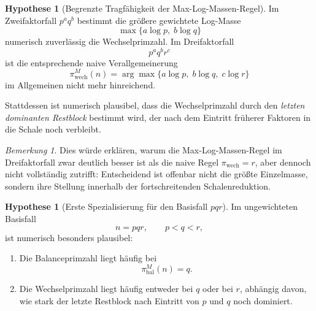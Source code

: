 \documentclass[11pt,a4paper]{article}
\theoremstyle{definition}
\newtheorem{hypothese}[satz]{Hypothese}
\theoremstyle{remark}
\newtheorem{bemerkung}[satz]{Bemerkung}
\begin{document}
	\begin{hypothese}[Begrenzte Tragfähigkeit der Max-Log-Massen-Regel]
		\label{hyp:dreifaktor_maxlog_begrenzt}
		Im Zweifaktorfall \(p^a q^b\) bestimmt die größere gewichtete Log-Masse
		\[
		\max\{a\log p,\; b\log q\}
		\]
		numerisch zuverlässig die Wechselprimzahl. Im Dreifaktorfall
		\[
		p^a q^b r^c
		\]
		ist die entsprechende naive Verallgemeinerung
		\[
		\pi_{\mathrm{wech}}^{M}(n)=\arg\max\{a\log p,\; b\log q,\; c\log r\}
		\]
		im Allgemeinen nicht mehr hinreichend.
		
		Stattdessen ist numerisch plausibel, dass die Wechselprimzahl durch den \emph{letzten
			dominanten Restblock} bestimmt wird, der nach dem Eintritt früherer Faktoren in die
		Schale noch verbleibt.
	\end{hypothese}
	
	\begin{bemerkung}
		Dies würde erklären, warum die Max-Log-Massen-Regel im Dreifaktorfall zwar deutlich besser
		ist als die naive Regel \(\pi_{\mathrm{wech}}=r\), aber dennoch nicht vollständig
		zutrifft: Entscheidend ist offenbar nicht die größte Einzelmasse, sondern ihre Stellung
		innerhalb der fortschreitenden Schalenreduktion.
	\end{bemerkung}
	
	\begin{hypothese}[Erste Spezialisierung für den Basisfall \(pqr\)]
		\label{hyp:dreifaktor_pqr}
		Im ungewichteten Basisfall
		\[
		n=pqr,\qquad p<q<r,
		\]
		ist numerisch besonders plausibel:
		
		\begin{enumerate}
			\item Die Balanceprimzahl liegt häufig bei
			\[
			\pi_{\mathrm{bal}}^{M}(n)=q.
			\]
			\item Die Wechselprimzahl liegt häufig entweder bei \(q\) oder bei \(r\), abhängig davon,
			wie stark der letzte Restblock nach Eintritt von \(p\) und \(q\) noch dominiert.
		\end{enumerate}
	\end{hypothese}
	
\end{document}
